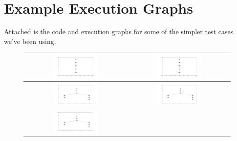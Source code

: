 \chapter{Example Execution Graphs}
Attached is the code and execution graphs for some of the simpler test cases
we've been using.





\begin{figure}[ht]
 \centering
 \begin{tabular}{| c | c |}
   \hline
   \includegraphics[width=0.45\textwidth]{graphs/1_0}
   &\includegraphics[width=0.45\textwidth]{graphs/1_1}\\\hline
   \includegraphics[width=0.45\textwidth]{graphs/1_2}
   &\includegraphics[width=0.45\textwidth]{graphs/1_3}\\\hline
   \includegraphics[width=0.45\textwidth]{graphs/1_4}

\end{tabular}
\end{figure}
